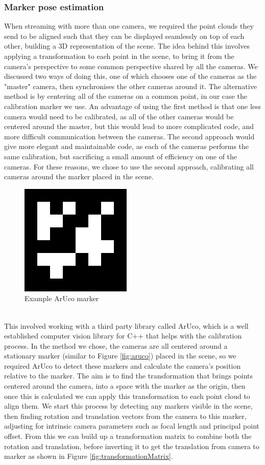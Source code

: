 \documentclass{article}
\begin{document}
\subsubsection{Marker pose estimation}
When streaming with more than one camera, we required the point clouds they send to be aligned such that they can be displayed seamlessly on top of each other, building a 3D representation of the scene. The idea behind this involves applying a transformation to each point in the scene, to bring it from the camera's perspective to some common perspective shared by all the cameras. We discussed two ways of doing this, one of which chooses one of the cameras as the "master" camera, then synchronises the other cameras around it. The alternative method is by centering all of the cameras on a common point, in our case the calibration marker we use. An advantage of using the first method is that one less camera would need to be calibrated, as all of the other cameras would be centered around the master, but this would lead to more complicated code, and more difficult communication between the cameras. The second approach would give more elegant and maintainable code, as each of the cameras performs the same calibration, but sacrificing a small amount of efficiency on one of the cameras. For these reasons, we chose to use the second approach, calibrating all cameras around the marker placed in the scene. \\
\begin{figure}[h]
  \centering
  \includegraphics[scale=0.6]{aruco}
  \caption{Example ArUco marker}
\end{figure} \\
This involved working with a third party library called ArUco, which is a well established computer vision library for C++ that helps with the calibration process. In the method we chose, the cameras are all centered around a stationary marker (similar to Figure \ref{fig:aruco}) placed in the scene, so we required ArUco to detect these markers and calculate the camera's position relative to the marker. The aim is to find the transformation that brings points centered around the camera, into a space with the marker as the origin, then once this is calculated we can apply this transformation to each point cloud to align them. We start this process by detecting any markers visible in the scene, then finding rotation and translation vectors from the camera to this marker, adjusting for intrinsic camera parameters such as focal length and principal point offset. From this we can build up a transformation matrix to combine both the rotation and translation, before inverting it to get the translation from camera to marker as shown in Figure \ref{fig:transformationMatrix}. \\
\end{document}
